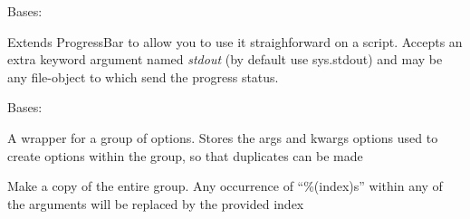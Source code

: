\documentclass[letterpaper,10pt,english]{sphinxmanual}
\begin{document}

\begin{fulllineitems}
\label{index:encore.utils.AnimatedProgressBar}
Bases: {\hyperref[index:encore.utils.ProgressBar]{}}

Extends ProgressBar to allow you to use it straighforward on a script.
Accepts an extra keyword argument named \emph{stdout} (by default use sys.stdout)
and may be any file-object to which send the progress status.

\begin{fulllineitems}
\label{index:encore.utils.AnimatedProgressBar.show_progress}
\end{fulllineitems}


\end{fulllineitems}


\begin{fulllineitems}
\label{index:encore.utils.OptionGroup}
Bases: 

A wrapper for a group of options. Stores the args and kwargs options
used to create options within the group, so that duplicates can be
made

\begin{fulllineitems}
\label{index:encore.utils.OptionGroup.add_option}
\end{fulllineitems}


\begin{fulllineitems}
\label{index:encore.utils.OptionGroup.duplicate}
Make a copy of the entire group. Any occurrence of ``\%(index)s''
within any of the arguments will be replaced by the provided index

\end{fulllineitems}


\end{fulllineitems}
\end{document}
